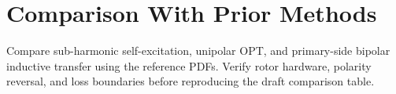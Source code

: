 \section{Comparison With Prior Methods}
Compare sub-harmonic self-excitation, unipolar OPT, and primary-side bipolar inductive transfer using the reference PDFs. Verify rotor hardware, polarity reversal, and loss boundaries before reproducing the draft comparison table.
